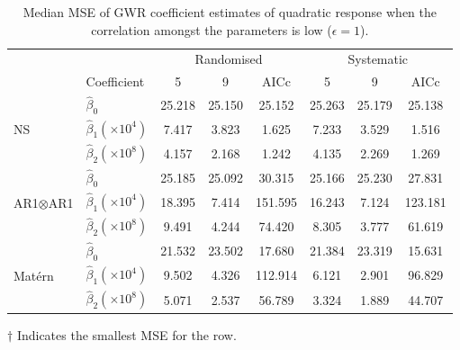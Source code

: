 \documentclass[a4paper]{article} 	%
\newcommand{\Matern}{Mat\'ern }
\begin{document}
\begin{table}[H]
	\centering
\begin{threeparttable}
	\caption{Median MSE of GWR coefficient estimates of quadratic response when the correlation amongst the parameters is low ($\epsilon=1$).}\label{tb:MSEquadratic}
	\begin{tabular}{llcccccc} \toprule
		 &  & \multicolumn{3}{c}{Randomised} & \multicolumn{3}{c}{Systematic} \\ 
		  & Coefficient & 5  & 9  & AICc & 5  & 9  & AICc \\ \midrule
		\multirow{3}{*}{NS}   & $\hat{\beta}_0$ & 25.218 & 25.150 & 25.152  & 25.263 & 25.179 & 25.138\tnote{$\dagger$}  \\
		& $\hat{\beta}_1 (\times 10^4)$ & 7.417  & 3.823  & 1.625 & 7.233  & 3.529  & 1.516\tnote{$\dagger$}  \\
		& $\hat{\beta}_2 (\times 10^8)$  & 4.157  & 2.168  & 1.242\tnote{$\dagger$} & 4.135  & 2.269  & 1.269   \\ \midrule 
		\multirow{3}{*}{AR1$\otimes$AR1}  & $\hat{\beta}_0$  & 25.185 & 25.092\tnote{$\dagger$} & 30.315  & 25.166 & 25.230 & 27.831  \\
		&$\hat{\beta}_1 (\times 10^4)$  & 18.395 & 7.414  & 151.595 & 16.243 & 7.124\tnote{$\dagger$}  & 123.181  \\
		& $\hat{\beta}_2 (\times 10^8)$ & 9.491  & 4.244  & 74.420  & 8.305  & 3.777\tnote{$\dagger$}  & 61.619 \\ \midrule
		\multirow{3}{*}{\Matern} & $\hat{\beta}_0$  & 21.532 & 23.502 & 17.680  & 21.384 & 23.319 & 15.631\tnote{$\dagger$} \\
		&$\hat{\beta}_1 (\times 10^4)$  & 9.502  & 4.326  & 112.914 & 6.121  & 2.901\tnote{$\dagger$}  & 96.829  \\
		& $\hat{\beta}_2 (\times 10^8)$  & 5.071  & 2.537  & 56.789  & 3.324  & 1.889\tnote{$\dagger$}  & 44.707 \\ \bottomrule
	\end{tabular}
	    \begin{tablenotes}
	        \item[$\dagger$] \footnotesize Indicates the smallest MSE for the row.
	    \end{tablenotes}
\end{threeparttable}
\end{table}
\end{document}
